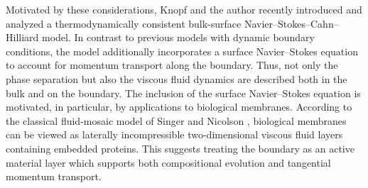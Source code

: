 \documentclass[11pt,reqno]{amsart}
\theoremstyle{remark}
\numberwithin{equation}{section}
\begin{document}
Motivated by these considerations, Knopf and the author \cite{Knopf2025a} recently introduced and analyzed a thermodynamically consistent bulk-surface Navier--Stokes--Cahn--Hilliard model. In contrast to previous models with dynamic boundary conditions, the model additionally incorporates a surface Navier--Stokes equation to account for momentum transport along the boundary. Thus, not only the phase separation but also the viscous fluid dynamics are described both in the bulk and on the boundary. The inclusion of the surface Navier--Stokes equation is motivated, in particular, by applications to biological membranes. According to the classical fluid-mosaic model of Singer and Nicolson \cite{Singer1972}, biological membranes can be viewed as laterally incompressible two-dimensional viscous fluid layers containing embedded proteins. This suggests treating the boundary as an active material layer which supports both compositional evolution and tangential momentum transport.
\end{document}
